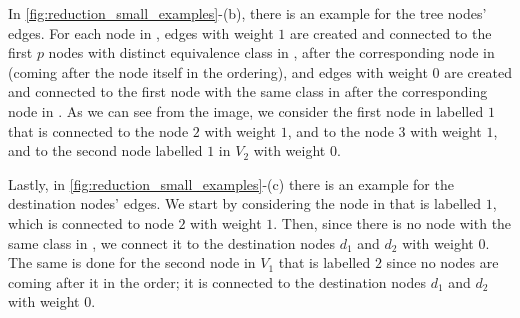 In \cref{fig:reduction_small_examples}-(b), there is an example for the tree nodes' edges. For each node in , edges with weight $1$ are created and connected to the first $p$ nodes with distinct equivalence class in , after the corresponding node in  (coming after the node itself in the ordering), and edges with weight $0$ are created and connected to the first node with the same class in  after the corresponding node in . As we can see from the image, we consider the first node in  labelled $1$ that is connected to the node $2$ with weight $1$, and to the node $3$ with weight $1$, and to the second node labelled $1$ in $V_2$ with weight $0$.

Lastly, in \cref{fig:reduction_small_examples}-(c) there is an example for the destination nodes' edges. We start by considering the node in  that is labelled $1$, which is connected to node $2$ with weight $1$. Then, since there is no node with the same class in , we connect it to the destination nodes $d_1$ and $d_2$ with weight $0$. The same is done for the second node in $V_1$ that is labelled $2$ since no nodes are coming after it in the order; it is connected to the destination nodes $d_1$ and $d_2$ with weight $0$.

